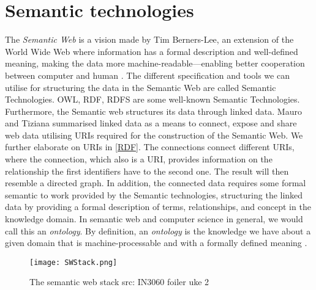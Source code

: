 \section{Semantic technologies}
The \emph{Semantic Web} is a vision made by Tim Berners-Lee, an extension of the World Wide Web where information has a formal description and well-defined meaning, making the data more machine-readable—enabling better cooperation between computer and human \autocite{Berner-Lee_The_samantic_web}. The different specification and tools we can utilise for structuring the data in the Semantic Web are called Semantic Technologies. OWL, RDF, RDFS are some well-known Semantic Technologies. Furthermore, the Semantic web structures its data through linked data. Mauro and Tiziana summarised linked data as a means to connect, expose and share web data utilising URIs required for the construction of the Semantic Web\autocite{Mauro_Tiziana_linked_data}. We further elaborate on URIs in \autoref{RDF}. The connections connect different URIs, where the connection, which also is a URI, provides information on the relationship the first identifiers have to the second one. The result will then resemble a directed graph. In addition, the connected data requires some formal semantic to work provided by the Semantic technologies, structuring the linked data by providing a formal description of terms, relationships, and concept in the knowledge domain. In semantic web and computer science in general, we would call this an \emph{ontology}. By definition, an \emph{ontology} is the knowledge we have about a given domain that is machine-processable and with a formally defined meaning \autocite[2]{FOSWT}.

\begin{figure}
    \centering
    \texttt{[image: SWStack.png]}
    \caption{The semantic web stack src: IN3060 foiler uke 2}
    \label{fig:SW stack}
\end{figure}


